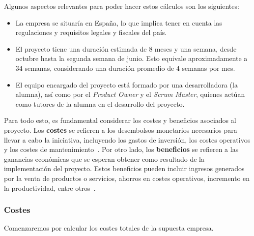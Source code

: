 Algunos aspectos relevantes para poder hacer estos cálculos son los siguientes: 
\begin{itemize}
    \item La empresa se situaría en España, lo que implica tener en cuenta las regulaciones y requisitos legales y fiscales del país.
    \item El proyecto tiene una duración estimada de 8 meses y una semana, desde octubre hasta la segunda semana de junio. Esto equivale aproximadamente a 34 semanas, considerando una duración promedio de 4 semanas por mes.
    \item El equipo encargado del proyecto está formado por una desarrolladora (la alumna), así como por el \textit{Product Owner} y el \textit{Scrum Master}, quienes actúan como tutores de la alumna en el desarrollo del proyecto.
\end{itemize}

Para todo esto, es fundamental considerar los costes y beneficios asociados al proyecto. Los \textbf{costes} se refieren a los desembolsos monetarios necesarios para llevar a cabo la iniciativa, incluyendo los gastos de inversión, los costes operativos y los costes de mantenimiento~\cite{costebeneficio2006}. Por otro lado, los \textbf{beneficios} se refieren a las ganancias económicas que se esperan obtener como resultado de la implementación del proyecto. Estos beneficios pueden incluir ingresos generados por la venta de productos o servicios, ahorros en costes operativos, incremento en la productividad, entre otros~\cite{costebeneficio2006}. 

\subsubsection{Costes}
Comenzaremos por calcular los costes totales de la supuesta empresa.

